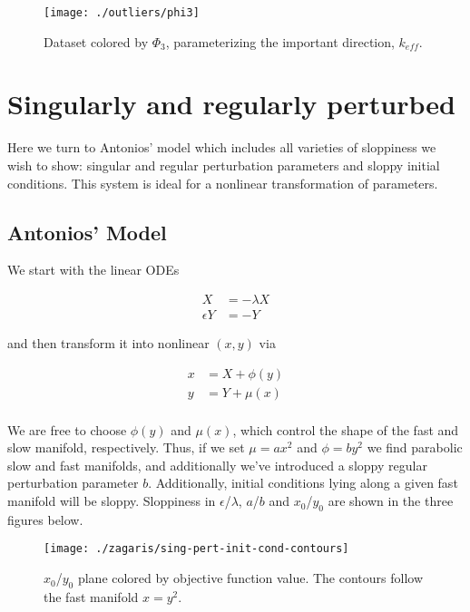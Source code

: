 \documentclass[11pt]{article}
\begin{document}
\begin{figure}[htbp]
  \centering
  \texttt{[image: ./outliers/phi3]}
  \caption{Dataset colored by $\Phi_3$, parameterizing the important
    direction, $k_{eff}$. \label{fig3}}
\end{figure}


\section{Singularly and regularly perturbed}

Here we turn to Antonios' model which includes all varieties of sloppiness we wish to show: singular and regular perturbation parameters and sloppy initial conditions. This system is ideal for a nonlinear transformation of parameters.

\subsection{Antonios' Model}

We start with the linear ODEs

\begin{align*}
  X &= -\lambda X \\
  \epsilon Y &= -Y
\end{align*}

and then transform it into nonlinear $(x, y)$ via 

\begin{align*}
  x &= X + \phi(y) \\
  y &= Y + \mu(x) \\
\end{align*}

We are free to choose $\phi(y)$ and $\mu(x)$, which control the shape of the fast and slow manifold, respectively. Thus, if we set $\mu = a x^2$ and $\phi = b y^2$ we find parabolic slow and fast manifolds, and additionally we've introduced a sloppy regular perturbation parameter $b$. Additionally, initial conditions lying along a given fast manifold will be sloppy. Sloppiness in $\epsilon$/$\lambda$, $a$/$b$ and $x_0$/$y_0$ are shown in the three figures below.

\begin{figure}[htbp]
  \centering
  \texttt{[image: ./zagaris/sing-pert-init-cond-contours]}
  \caption{$x_0$/$y_0$ plane colored by objective function value. The contours follow the fast manifold $x=y^2$.}
\end{figure}
\end{document}
